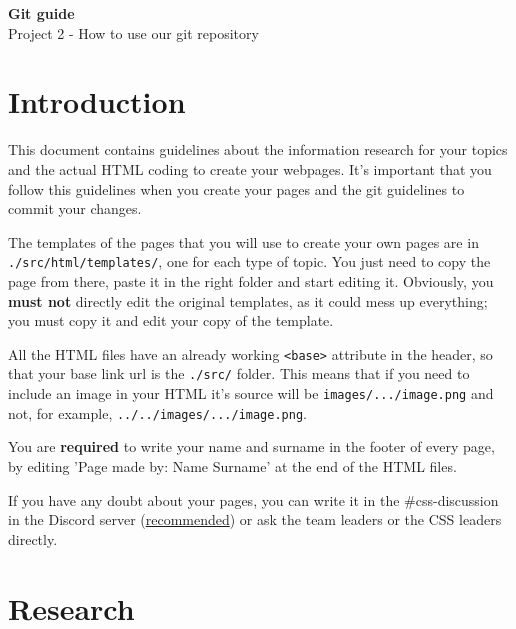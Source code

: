 \documentclass[a4paper,12pt]{article}
\newcommand{\<}{\textless}
\renewcommand{\>}{\textgreater}
\begin{document}
\begin{center}
 \huge{\textbf{Git guide}}\\[.5em]
 \Large{Project 2 - How to use our git repository}
\end{center}
\vspace{3em}
\tableofcontents

\newpage
\section{Introduction}
This document contains guidelines about the information research for your topics and the actual HTML coding to create your webpages. It's important that you follow this guidelines when you create your pages and the git guidelines to commit your changes.

The templates of the pages that you will use to create your own pages are in \texttt{./src/html/templates/}, one for each type of topic. You just need to copy the page from there, paste it in the right folder and start editing it. Obviously, you \textbf{must not} directly edit the original templates, as it could mess up everything; you must copy it and edit your copy of the template.

All the HTML files have an already working \texttt{<base>} attribute in the header, so that your base link url is the \texttt{./src/} folder. This means that if you need to include an image in your HTML it's source will be \texttt{images/.../image.png} and not, for example, \texttt{../../images/.../image.png}.

You are \textbf{required} to write your name and surname in the footer of every page, by editing 'Page made by: Name Surname' at the end of the HTML files.

If you have any doubt about your pages, you can write it in the \#css-discussion in the Discord server (\underline{recommended}) or ask the team leaders or the CSS leaders directly.

\section{Research}
\end{document}
